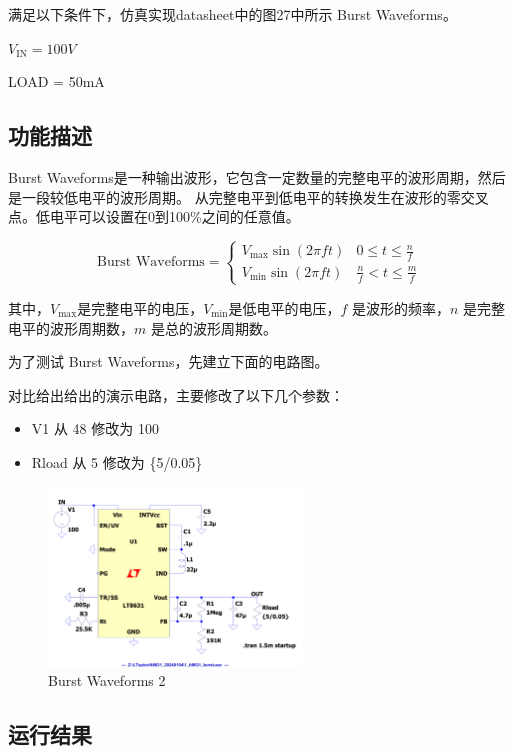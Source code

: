 \documentclass[lang=cn,10pt]{elegantbook}
\begin{document}
满足以下条件下，仿真实现datasheet中的图27中所示 Burst Waveforms。

$V_{\text{IN}} = 100V$

LOAD = 50mA

\subsection{功能描述}

Burst Waveforms是一种输出波形，它包含一定数量的完整电平的波形周期，然后是一段较低电平的波形周期。
从完整电平到低电平的转换发生在波形的零交叉点。低电平可以设置在0到100\%之间的任意值。

$$
\text{Burst Waveforms} = \begin{cases}
V_{\text{max}} \sin(2\pi f t) & 0 \leq t \leq \frac{n}{f}\\
V_{\text{min}} \sin(2\pi f t) & \frac{n}{f} < t \leq \frac{m}{f}
\end{cases}
$$

其中，$V_{\text{max}}$是完整电平的电压，$V_{\text{min}}$是低电平的电压，$f$ 是波形的频率，$n$ 是完整电平的波形周期数，$m$ 是总的波形周期数。

为了测试 Burst Waveforms，先建立下面的电路图。

对比给出给出的演示电路，主要修改了以下几个参数：

\begin{itemize}
    \item V1 从 48 修改为 100
    \item Rload 从 5 修改为 \{5/0.05\}
\end{itemize}

\begin{figure}[!htb]
    \centering\includegraphics[page=1, width=0.6\textwidth]{figure/1_lt8631_burst_asc.pdf}
    \caption{Burst Waveforms 2}
\end{figure}

\subsection{运行结果}
\end{document}
